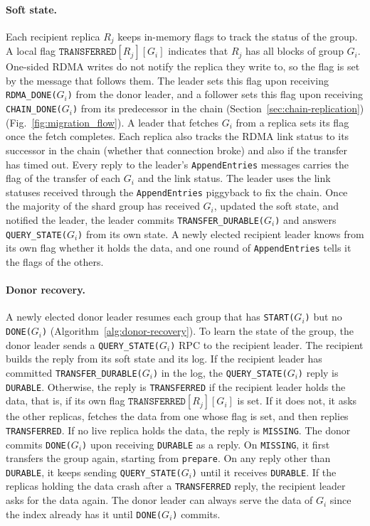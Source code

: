 \paragraph{Soft state.}
Each recipient replica $R_j$ keeps in-memory flags to track the status of the group. A local flag $\texttt{TRANSFERRED}[R_j][G_i]$ indicates that $R_j$ has all blocks of group $G_i$.
One-sided RDMA writes do not notify the replica they write to, so the flag is set by the message that follows them.
The leader sets this flag upon receiving \texttt{RDMA\_DONE($G_i$)} from the donor leader, and a follower sets this flag upon receiving \texttt{CHAIN\_DONE($G_i$)} from its predecessor in the chain (Section~\ref{sec:chain-replication}) (Fig.~\ref{fig:migration_flow}).
A leader that fetches $G_i$ from a replica sets its flag once the fetch completes.
Each replica also tracks the RDMA link status to its successor in the chain (whether that connection broke) and also if the transfer has timed out.
Every reply to the leader's \texttt{AppendEntries} messages carries the flag of the transfer of each $G_i$ and the link status.
The leader uses the link statuses received through the \texttt{AppendEntries} piggyback to fix the chain. Once the majority of the shard group has received $G_i$, updated the soft state, and notified the leader, the leader commits \texttt{TRANSFER\_DURABLE($G_i$)} and answers \texttt{QUERY\_STATE($G_i$)} from its own state.
A newly elected recipient leader knows from its own flag whether it holds the data, and one round of \texttt{AppendEntries} tells it the flags of the others.


\paragraph{Donor recovery.}
A newly elected donor leader resumes each group that has \texttt{START($G_i$)} but no \texttt{DONE($G_i$)} (Algorithm~\ref{alg:donor-recovery}).
To learn the state of the group, the donor leader sends a \texttt{QUERY\_STATE($G_i$)} RPC to the recipient leader.
The recipient builds the reply from its soft state and its log.
If the recipient leader has committed \texttt{TRANSFER\_DURABLE($G_i$)} in the log, the \texttt{QUERY\_STATE($G_i$)} reply is \texttt{DURABLE}.
Otherwise, the reply is \texttt{TRANSFERRED} if the recipient leader holds the data, that is, if its own flag $\texttt{TRANSFERRED}[R_j][G_i]$ is set.
If it does not, it asks the other replicas, fetches the data from one whose flag is set, and then replies \texttt{TRANSFERRED}.
If no live replica holds the data, the reply is \texttt{MISSING}.
The donor commits \texttt{DONE($G_i$)} upon receiving \texttt{DURABLE} as a reply.
On \texttt{MISSING}, it first transfers the group again, starting from \texttt{prepare}.
On any reply other than \texttt{DURABLE}, it keeps sending \texttt{QUERY\_STATE($G_i$)} until it receives \texttt{DURABLE}.
If the replicas holding the data crash after a \texttt{TRANSFERRED} reply, the recipient leader asks for the data again.
The donor leader can always serve the data of $G_i$ since the index already has it until \texttt{DONE($G_i$)} commits.

